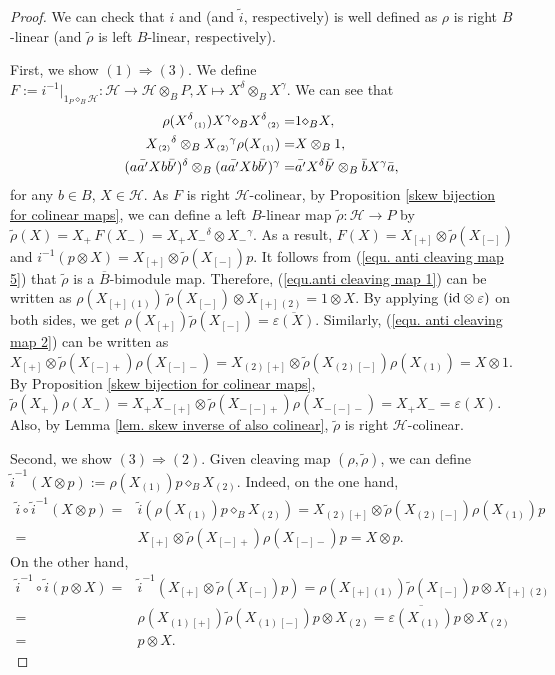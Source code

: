 \documentclass[a4paper,reqno]{amsart}
\newcommand*{\id}{\textup{id}}
\numberwithin{equation}{section}
\theoremstyle{plain}
\theoremstyle{remark}
\numberwithin{equation}{section}
\newcommand{\ot}{\otimes}
\newcommand{\BB}{\overline{B}}
\newcommand{\ti}{{\tilde{i}}}
\newcommand{\trho}{{\tilde{\rho}}}
\renewcommand{\o}{{}_{\scriptscriptstyle{(1)}}}
\renewcommand{\t}{{}_{\scriptscriptstyle{(2)}}}
\newcommand{\di}{{\diamond_{B}}}
\newcommand{\CH}{\mathcal{H}}
\begin{document}
\begin{proof}
   
    We can check that $i$ and (and $\ti$, respectively) is well defined as  $\rho$ is right $B$-linear (and $\trho$ is left $B$-linear, respectively). 
    
    First, we show $(1)\Rightarrow(3)$. We define $F:=i^{-1}|_{1_{P}\di\CH}:\CH\to \CH\ot_{B}P, X\mapsto  X^{\delta}\ot_{B}X^{\gamma}$. We can see that \begin{align}\label{equ.anti cleaving map 1}
\rho(X^{\delta}\o)X^{\gamma}\di X^{\delta}\t=&1\di X,\\
\label{equ. anti cleaving map 2}
X\t{}^{\delta}\ot_{B} X\t{}^{\gamma}\rho(X\o)=&X\ot_{B}1,\\
\label{equ. anti cleaving map 5}
(a\Bar{a'}X b\Bar{b'})^{\delta}\ot_{B}(a\Bar{a'}X b\Bar{b'})^{\gamma}=&\Bar{a'} X^{\delta}\Bar{b'}\ot_{B}\Bar{b} X^{\gamma}\Bar{a},
\end{align}
for any $b\in B$, $X\in \CH$. As $F$ is right $\CH$-colinear,  by Proposition \ref{skew bijection for colinear maps}, we can define a left $B$-linear map $\trho:\CH\to P$ by $\trho(X)=X_{+}\,F(X_{-})=X_{+}X_{-}{}^{\delta}\ot X_{-}{}^{\gamma}$. As a result, $F(X)=X_{[+]}\ot \trho(X_{[-]})$ and $i^{-1}(p\ot X)=X_{[+]}\ot \trho(X_{[-]})p$. It follows from (\ref{equ. anti cleaving map 5}) that $\trho$ is a $\BB$-bimodule map. Therefore, (\ref{equ.anti cleaving map 1})  can be written as $\rho(X_{[+]}\o)\, \trho(X_{[-]})\ot X_{[+]}\t=1\ot X$. By applying $(\id\ot \varepsilon)$ on both sides, we get $\rho(X_{[+]})\trho(X_{[-]})=\overline{\varepsilon(X)}$. Similarly, (\ref{equ. anti cleaving map 2}) can be written as $X{}_{[+]}\ot\trho(X{}_{[-]+})\rho(X{}_{[-]-})=X\t{}_{[+]}\ot\trho(X\t{}_{[-]})\rho(X\o)=X\ot 1$. By Proposition \ref{skew bijection for colinear maps}, $\trho(X{}_{+})\rho(X{}_{-})=X_{+}X{}_{-[+]}\ot\trho(X{}_{-[-]+})\rho(X{}_{-[-]-})=X_{+}X_{-}=\varepsilon(X)$. Also, by Lemma \ref{lem. skew inverse of also colinear}, $\trho$ is right $\CH$-colinear.




Second, we show $(3)\Rightarrow (2)$. Given cleaving map $(\rho, \trho)$, we can define $\ti^{-1}(X\ot p):=\rho(X\o)p\di X\t$. Indeed, on the one hand,
\begin{align*}
    \ti\circ \ti^{-1}(X\ot p)=&\ti(\rho(X\o)p\di X\t)=X\t{}_{[+]}\ot \trho(X\t{}_{[-]})\rho(X\o)p\\
    =&X{}_{[+]}\ot \trho(X{}_{[-]+})\rho(X{}_{[-]-})p=X\ot p.
\end{align*}
On the other hand,
\begin{align*}
    \ti^{-1}\circ \ti(p\ot X)=&\ti^{-1}(X_{[+]}\ot \trho(X_{[-]})p)= \rho(X_{[+]}\o)\trho(X_{[-]})p\ot X_{[+]}\t\\
    =&\rho(X\o{}_{[+]})\trho(X\o{}_{[-]})p\ot X\t=\overline{\varepsilon(X\o)}p\ot X\t\\
    =&p\ot X.
\end{align*}


\end{proof}
\end{document}
